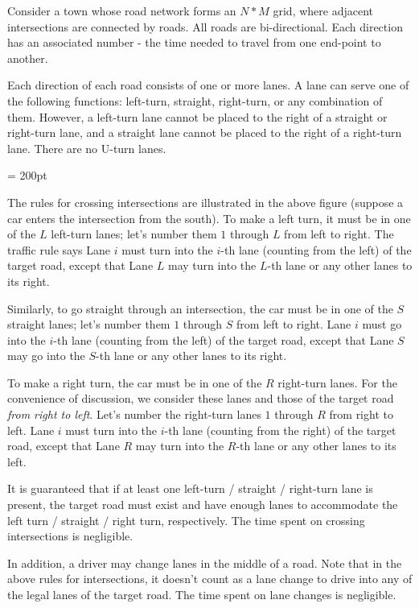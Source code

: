 

\def\probname{Safest Taxi}
\def\probno{?}
\def \headeryear {2020/2021}

\fullheader

Consider a town whose road network forms an $N * M$ grid, where adjacent intersections are connected by roads. All roads are bi-directional. Each direction has an associated number - the time needed to travel from one end-point to another.

Each direction of each road consists of one or more lanes. A lane can serve one of the following functions: left-turn, straight, right-turn, or any combination of them. However, a left-turn lane cannot be placed to the right of a straight or right-turn lane, and a straight lane cannot be placed to the right of a right-turn lane. There are no U-turn lanes.

\epsfxsize = 200pt
\centerline{}

The rules for crossing intersections are illustrated in the above figure (suppose a car enters the intersection from the south). To make a left turn, it must be in one of the $L$ left-turn lanes; let's number them $1$ through $L$ from left to right. The traffic rule says Lane $i$ must turn into the $i$-th lane (counting from the left) of the target road, except that Lane $L$ may turn into the $L$-th lane or any other lanes to its right. 

Similarly, to go straight through an intersection, the car must be in one of the $S$ straight lanes; let's number them $1$ through $S$ from left to right. Lane $i$ must go into the $i$-th lane (counting from the left) of the target road, except that Lane $S$ may go into the $S$-th lane or any other lanes to its right.

To make a right turn, the car must be in one of the $R$ right-turn lanes. For the convenience of discussion, we consider these lanes and those of the target road {\it from right to left}. Let's number the right-turn lanes $1$ through $R$ from right to left. Lane $i$ must turn into the $i$-th lane (counting from the right) of the target road, except that Lane $R$ may turn into the $R$-th lane or any other lanes to its left.

It is guaranteed that if at least one left-turn / straight / right-turn lane is present, the target road must exist and have enough lanes to accommodate the left turn / straight / right turn, respectively. The time spent on crossing intersections is negligible.

In addition, a driver may change lanes in the middle of a road. Note that in the above rules for intersections, it doesn't count as a lane change to drive into any of the legal lanes of the target road. The time spent on lane changes is negligible.

